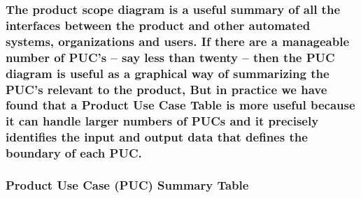 \documentclass[
]{article}
\begin{document}
\hypertarget{the-product-scope-diagram-is-a-useful-summary-of-all-the-interfaces-between-the-product-and-other-automated-systems-organizations-and-users.-if-there-are-a-manageable-number-of-pucs-say-less-than-twenty-then-the-puc-diagram-is-useful-as-a-graphical-way-of-summarizing-the-pucs-relevant-to-the-product-but-in-practice-we-have-found-that-a-product-use-case-table-is-more-useful-because-it-can-handle-larger-numbers-of-pucs-and-it-precisely-identifies-the-input-and-output-data-that-defines-the-boundary-of-each-puc.}{%
\subsubsection{The product scope diagram is a useful summary of all the
interfaces between the product and other automated systems,
organizations and users. If there are a manageable number of PUC's --
say less than twenty -- then the PUC diagram is useful as a graphical
way of summarizing the PUC's relevant to the product, But in practice we
have found that a Product Use Case Table is more useful because it can
handle larger numbers of PUCs and it precisely identifies the input and
output data that defines the boundary of each
PUC.}\label{the-product-scope-diagram-is-a-useful-summary-of-all-the-interfaces-between-the-product-and-other-automated-systems-organizations-and-users.-if-there-are-a-manageable-number-of-pucs-say-less-than-twenty-then-the-puc-diagram-is-useful-as-a-graphical-way-of-summarizing-the-pucs-relevant-to-the-product-but-in-practice-we-have-found-that-a-product-use-case-table-is-more-useful-because-it-can-handle-larger-numbers-of-pucs-and-it-precisely-identifies-the-input-and-output-data-that-defines-the-boundary-of-each-puc.}}

\hypertarget{section-20}{%
\subsubsection{}\label{section-20}}

\hypertarget{product-use-case-puc-summary-table}{%
\subsubsection{Product Use Case (PUC) Summary
Table}\label{product-use-case-puc-summary-table}}
\end{document}
